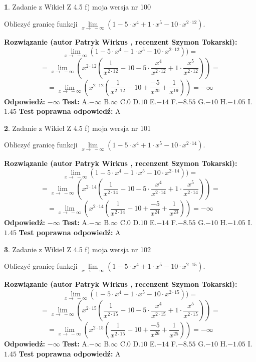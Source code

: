 \documentclass[12pt, a4paper]{article}
\theoremstyle{definition} %
\newtheorem{zad}{}
\newcommand{\zadStart}[1]{\begin{zad}#1\newline}
\newcommand{\zadStop}{\end{zad}}
\newcommand{\rozwStart}[2]{\noindent \textbf{Rozwiązanie (autor #1 , recenzent #2): }\newline}
\newcommand{\rozwStop}{\newline}
\newcommand{\odpStart}{\noindent \textbf{Odpowiedź:}\newline}
\newcommand{\odpStop}{\newline}
\newcommand{\testStart}{\noindent \textbf{Test:}\newline}
\newcommand{\testStop}{\newline}
\newcommand{\kluczStart}{\noindent \textbf{Test poprawna odpowiedź:}\newline}
\newcommand{\kluczStop}{\newline}
\begin{document}
\zadStart{Zadanie z Wikieł Z 4.5 f) moja wersja nr 100}


Obliczyć granicę funkcji  $\lim\limits_{x\to\ -\infty}(1 - 5 \cdot x^{4}+1 \cdot x^{5}- 10 \cdot x^{2\cdot12})$.
\zadStop
\rozwStart{Patryk Wirkus}{Szymon Tokarski}
$$\lim\limits_{x\to\ -\infty}(1 - 5 \cdot x^{4}+1 \cdot x^{5}- 10 \cdot x^{2\cdot12}))=$$
$$=\lim\limits_{x\to\ -\infty}(x^{2\cdot12}(\frac{1}{x^{2\cdot12}}-10 -5 \cdot \frac{x^{4}}{x^{2\cdot12}}+1 \cdot \frac{x^{5}}{x^{2\cdot12}}))=$$
$$=\lim\limits_{x\to\ -\infty}(x^{2\cdot12}(\frac{1}{x^{2\cdot12}}-10 + \frac{-5}{x^{20}}+ \frac{1}{x^{19}}))=-\infty$$
\rozwStop
\odpStart
$-\infty$
\odpStop
\testStart
A.$-\infty$ B.$\infty$ C.$0$ D.$10$ E.$-14$
F.$-8.55$ G.$-10$
H.$-1.05$
I.$1.45$
\testStop
\kluczStart
A
\kluczStop



\zadStart{Zadanie z Wikieł Z 4.5 f) moja wersja nr 101}


Obliczyć granicę funkcji  $\lim\limits_{x\to\ -\infty}(1 - 5 \cdot x^{4}+1 \cdot x^{5}- 10 \cdot x^{2\cdot14})$.
\zadStop
\rozwStart{Patryk Wirkus}{Szymon Tokarski}
$$\lim\limits_{x\to\ -\infty}(1 - 5 \cdot x^{4}+1 \cdot x^{5}- 10 \cdot x^{2\cdot14}))=$$
$$=\lim\limits_{x\to\ -\infty}(x^{2\cdot14}(\frac{1}{x^{2\cdot14}}-10 -5 \cdot \frac{x^{4}}{x^{2\cdot14}}+1 \cdot \frac{x^{5}}{x^{2\cdot14}}))=$$
$$=\lim\limits_{x\to\ -\infty}(x^{2\cdot14}(\frac{1}{x^{2\cdot14}}-10 + \frac{-5}{x^{24}}+ \frac{1}{x^{23}}))=-\infty$$
\rozwStop
\odpStart
$-\infty$
\odpStop
\testStart
A.$-\infty$ B.$\infty$ C.$0$ D.$10$ E.$-14$
F.$-8.55$ G.$-10$
H.$-1.05$
I.$1.45$
\testStop
\kluczStart
A
\kluczStop



\zadStart{Zadanie z Wikieł Z 4.5 f) moja wersja nr 102}


Obliczyć granicę funkcji  $\lim\limits_{x\to\ -\infty}(1 - 5 \cdot x^{4}+1 \cdot x^{5}- 10 \cdot x^{2\cdot15})$.
\zadStop
\rozwStart{Patryk Wirkus}{Szymon Tokarski}
$$\lim\limits_{x\to\ -\infty}(1 - 5 \cdot x^{4}+1 \cdot x^{5}- 10 \cdot x^{2\cdot15}))=$$
$$=\lim\limits_{x\to\ -\infty}(x^{2\cdot15}(\frac{1}{x^{2\cdot15}}-10 -5 \cdot \frac{x^{4}}{x^{2\cdot15}}+1 \cdot \frac{x^{5}}{x^{2\cdot15}}))=$$
$$=\lim\limits_{x\to\ -\infty}(x^{2\cdot15}(\frac{1}{x^{2\cdot15}}-10 + \frac{-5}{x^{26}}+ \frac{1}{x^{25}}))=-\infty$$
\rozwStop
\odpStart
$-\infty$
\odpStop
\testStart
A.$-\infty$ B.$\infty$ C.$0$ D.$10$ E.$-14$
F.$-8.55$ G.$-10$
H.$-1.05$
I.$1.45$
\testStop
\kluczStart
A
\kluczStop
\end{document}
